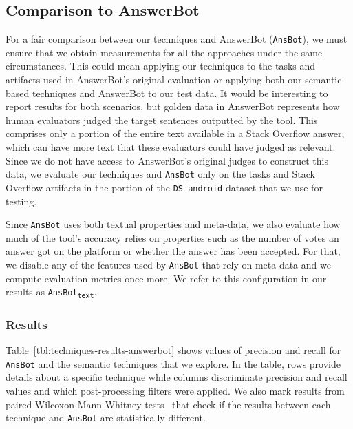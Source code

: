 \subsection{Comparison to AnswerBot}
\label{cp5:comparison}





For a fair comparison between our techniques and AnswerBot (\texttt{AnsBot}), we must ensure that we obtain measurements for all the approaches under the same circumstances. 
This could mean applying our techniques to the tasks and artifacts used in AnswerBot's original evaluation or applying both our semantic-based techniques and AnswerBot to our test data.
It would be interesting to report results for both scenarios, but golden data in AnswerBot represents how human evaluators judged the target sentences outputted by the tool.
This comprises only a portion of the entire text available in a Stack Overflow answer, which can have more text that these evaluators could have judged as relevant. 
Since we do not have access to AnswerBot's original judges to construct this data,
 we evaluate our techniques and \texttt{AnsBot} only on the tasks and Stack Overflow artifacts in the portion of the \texttt{DS-android} dataset that we use for testing.


Since \texttt{AnsBot} uses both textual properties and meta-data, 
we also evaluate how much of the tool's accuracy relies on properties such as the number of votes an answer got on the platform
or whether the answer has been accepted.
For that, we disable any of the features used by \texttt{AnsBot} that rely on meta-data and we compute evaluation metrics once more.
We refer to this configuration in our results as \texttt{AnsBot\textsubscript{text}}.


\subsubsection{Results}




Table~\ref{tbl:techniques-results-answerbot} shows values of precision and recall for  \texttt{AnsBot} and the semantic techniques that we explore. 
In the table, rows provide details about a specific technique while columns discriminate 
precision and recall values and which post-processing filters were applied. 
We also mark results from paired Wilcoxon-Mann-Whitney tests~\cite{mannWhitneyU} 
that check if the results between each technique and \texttt{AnsBot} are statistically different.


